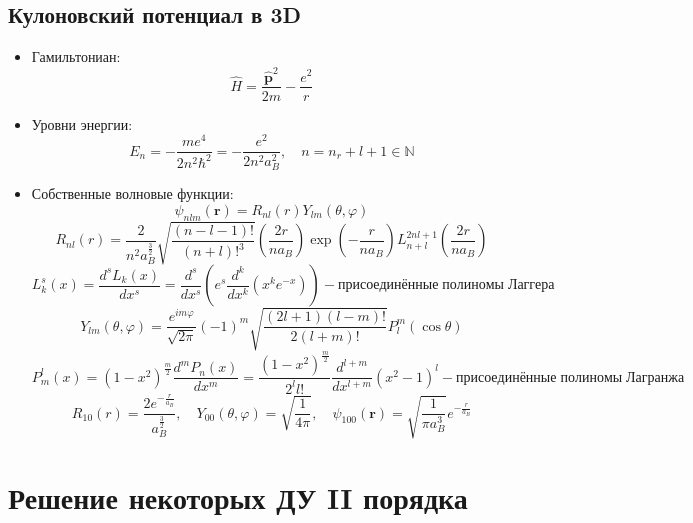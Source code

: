 \documentclass[12pt]{article}
\theoremstyle{definition}
\begin{document}
\subsection{Кулоновский потенциал в 3D}
\begin{itemize}
\item Гамильтониан:
    \begin{equation}
        \hat{H}=\frac{\hat{\textbf{p}}^2}{2m}-\frac{e^2}{r}
    \end{equation}
    \item Уровни энергии:
    \begin{equation}
        E_n=-\frac{me^4}{2n^2\hbar^2}=-\frac{e^2}{2n^2a_B^2},\quad n=n_r+l+1\in\mathbb{N}
    \end{equation}
    \item Собственные волновые функции:
    \begin{equation}
        \psi_{nlm}(\textbf{r})=R_{nl}(r)Y_{lm}(\theta,\varphi)
    \end{equation}
    \begin{equation}
        R_{nl}(r)=\frac{2}{n^2a_B^\frac{3}{2}}\sqrt{\frac{(n-l-1)!}{(n+l)!^3}}\left(\frac{2r}{na_B}\right)\exp\left(-\frac{r}{na_B}\right)L^{2nl+1}_{n+l}\left(\frac{2r}{na_B}\right)
    \end{equation}
    \begin{equation}
        L^s_k(x)=\frac{d^sL_k(x)}{dx^s}=\frac{d^s}{dx^s}\left(e^s\frac{d^k}{dx^k}(x^ke^{-x})\right) - присоединённые\;полиномы\;Лаггера
    \end{equation}
    \begin{equation}
        Y_{lm}(\theta,\varphi)=\frac{e^{im\varphi}}{\sqrt{2\pi}}(-1)^m\sqrt{\frac{(2l+1)(l-m)!}{2(l+m)!}}P^m_l(\cos\theta)
    \end{equation}
    \begin{equation*}
        P^l_m(x)=(1-x^2)^\frac{m}{2}\frac{d^mP_n(x)}{dx^m}=\frac{(1-x^2)^\frac{m}{2}}{2^ll!}\frac{d^{l+m}}{dx^{l+m}}(x^2-1)^l - присоединённые\;полиномы\;Лагранжа
    \end{equation*}
    \begin{equation}
        R_{10}(r)=\frac{2e^{-\frac{r}{a_B}}}{a^\frac{3}{2}_B},\quad Y_{00}(\theta,\varphi)=\sqrt{\frac{1}{4\pi}},\quad\psi_{100}(\textbf{r})=\sqrt{\frac{1}{\pi a^3_B}}e^{-\frac{r}{a_B}}
    \end{equation}
\end{itemize}
\section{Решение некоторых ДУ II порядка}
\end{document}

